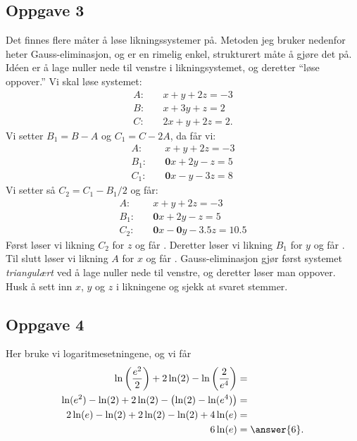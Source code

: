 \subsection*{Oppgave 3}
Det finnes flere måter å løse likningssystemer på.
Metoden jeg bruker nedenfor heter Gauss-eliminasjon, og er en rimelig enkel, strukturert måte å gjøre det på. 
Idéen er å lage nuller nede til venstre i likningsystemet, og deretter ``løse oppover.''
Vi skal løse systemet:
\begin{align*}
	A:& \quad x  +   y  +  2z = -3 \\
	B:& \quad x  +    3y  +   z = 2 \\
	C:& \quad 2x   +  y  +   2z = 2 .
\end{align*}
Vi setter $B_1 = B - A$ og $C_1 = C - 2A$, da får vi:
\begin{align*}
A:& \quad x  +   y  +  2z = -3 \\
B_1:& \quad \mathbf{0}x  +    2y     -z = 5 \\
C_1:& \quad \mathbf{0}x   -  y    -3z = 8
\end{align*}
Vi setter så $C_2 = C_1 - B_1 / 2$ og får:
\begin{align*}
A:& \quad x  +   y  +  2z = -3 \\
B_1:& \quad \mathbf{0}x  +    2y     -z = 5 \\
C_2:& \quad \mathbf{0}x   -  \mathbf{0}y    -3.5z = 10.5
\end{align*}
Først løser vi likning $C_2$ for $z$ og får .
Deretter løser vi likning $B_1$ for $y$ og får .
Til slutt løser vi likning $A$ for $x$ og får .
Gauss-eliminasjon gjør først systemet \emph{triangulært} ved å lage nuller nede til venstre, og deretter løser man oppover.
Husk å sett inn $x$, $y$ og $z$ i likningene og sjekk at svaret stemmer.


\subsection*{Oppgave 4}
Her bruke vi logaritmesetningene, og vi får
\begin{align*}
	\ln \left(\frac{e^2}{2}\right) + 2 \ln (2) - \ln \left(\frac{2}{e^4}\right) &=  \\
	\ln(e^2) - \ln(2) + 2\ln(2) - \left( \ln (2) - \ln (e^4)\right) &= \\
	2 \ln(e) - \ln(2) + 2\ln(2) - \ln (2) + 4 \ln (e) &= \\
	6 \ln(e) &= \answer{6} .
\end{align*}

